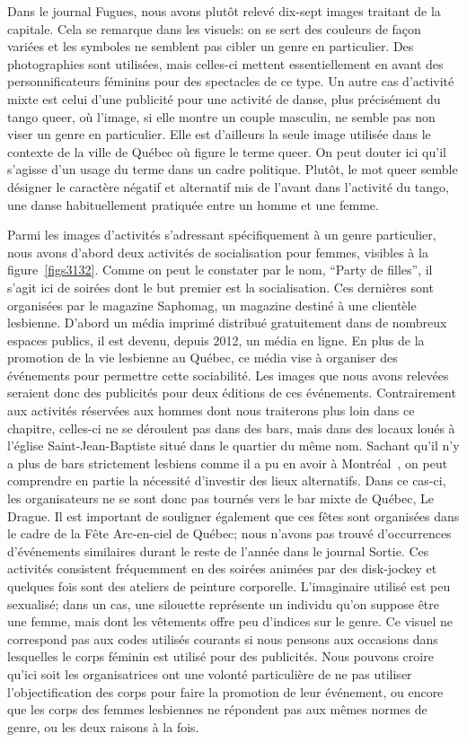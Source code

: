 Dans le journal Fugues, nous avons plutôt relevé dix-sept images traitant de la capitale.
Cela se remarque dans les visuels: on se sert des couleurs de façon variées et les symboles ne semblent pas cibler un genre en particulier.
Des photographies sont utilisées, mais celles-ci mettent essentiellement en avant des personnificateurs féminins pour des spectacles de ce type.
Un autre cas d'activité mixte est celui d'une publicité pour une activité de danse, plus précisément du tango queer, où l'image, si elle montre un couple masculin, ne semble pas non viser un genre en particulier.
Elle est d'ailleurs la seule image utilisée dans le contexte de la ville de Québec où figure le terme queer.
On peut douter ici qu'il s'agisse d'un usage du terme dans un cadre politique.
Plutôt, le mot queer semble désigner le caractère négatif et alternatif mis de l'avant dans l'activité du tango, une danse habituellement pratiquée entre un homme et une femme.

Parmi les images d'activités s'adressant spécifiquement à un genre particulier, nous avons d'abord deux activités de socialisation pour femmes, visibles à la figure~\ref{figs3132}.
Comme on peut le constater par le nom, \enquote{Party de filles}, il s'agit ici de soirées dont le but premier est la socialisation.
Ces dernières sont organisées par le magazine Saphomag, un magazine destiné à une clientèle lesbienne.
D'abord un média imprimé distribué gratuitement dans de nombreux espaces publics, il est devenu, depuis 2012, un média en ligne.
En plus de la promotion de la vie lesbienne au Québec, ce média vise à organiser des événements pour permettre cette sociabilité\citep{Saphomag2016}.
Les images que nous avons relevées seraient donc des publicités pour deux éditions de ces événements.
Contrairement aux activités réservées aux hommes dont nous traiterons plus loin dans ce chapitre, celles-ci ne se déroulent pas dans des bars, mais dans des locaux loués à l'église Saint-Jean-Baptiste situé dans le quartier du même nom.
Sachant qu'il n'y a plus de bars strictement lesbiens comme il a pu en avoir à Montréal~\citep{Podmore2006}, on peut comprendre en partie la nécessité d'investir des lieux alternatifs.
Dans ce cas-ci, les organisateurs ne se sont donc pas tournés vers le bar mixte de Québec, Le Drague.
Il est important de souligner également que ces fêtes sont organisées dans le cadre de la Fête Arc-en-ciel de Québec; nous n'avons pas trouvé d'occurrences d'événements similaires durant le reste de l'année dans le journal Sortie.
Ces activités consistent fréquemment en des soirées animées par des disk-jockey et quelques fois sont des ateliers de peinture corporelle.
L'imaginaire utilisé est peu sexualisé; dans un cas, une silouette représente un individu qu'on suppose être une femme, mais dont les vêtements offre peu d'indices sur le genre. 
Ce visuel ne correspond pas aux codes utilisés courants si nous pensons aux occasions dans lesquelles le corps féminin est utilisé pour des publicités.
Nous pouvons croire qu'ici soit les organisatrices ont une volonté particulière de ne pas utiliser l'objectification des corps pour faire la promotion de leur événement, ou encore que les corps des femmes lesbiennes ne répondent pas aux mêmes normes de genre, ou les deux raisons à la fois.


